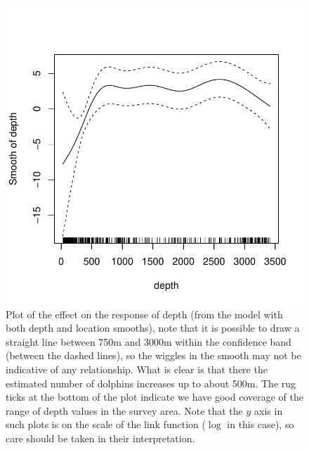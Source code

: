 \documentclass[a4paper,12pt]{article}
\begin{document}
\newpage

\begin{figure}[h!]
  \caption{Plot of the effect on the response of depth (from the model with both depth and location smooths), note that it is possible to draw a straight line between 750m and 3000m within the confidence band (between the dashed lines), so the wiggles in the smooth may not be indicative of any relationship. What is clear is that there the estimated number of dolphins increases up to about 500m. The rug ticks at the bottom of the plot indicate we have good coverage of the range of depth values in the survey area. Note that the $y$ axis in such plots is on the scale of the link function ($\log$ in this case), so care should be taken in their interpretation.}
  \label{depth-gamplot}
  \begin{center}
    \includegraphics[width=\textwidth]{fit-depth-gam}
  \end{center}
\end{figure}

\newpage
\end{document}
